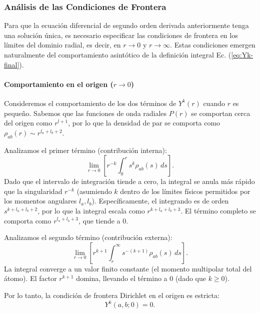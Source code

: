 \documentclass[12pt, a4paper, oneside, spanish]{book}
\begin{document}
\subsubsection{Análisis de las Condiciones de Frontera}

Para que la ecuación diferencial de segundo orden derivada anteriormente tenga una solución única, es necesario especificar las condiciones de frontera en los límites del dominio radial, es decir, en $r \to 0$ y $r \to \infty$. Estas condiciones emergen naturalmente del comportamiento asintótico de la definición integral Ec. (\cref{eq:Yk-final}).

\paragraph{Comportamiento en el origen ($r \to 0$)}

Consideremos el comportamiento de los dos términos de $Y^k(r)$ cuando $r$ es pequeño. Sabemos que las funciones de onda radiales $P(r)$ se comportan cerca del origen como $r^{l+1}$, por lo que la densidad de par se comporta como $\rho_{ab}(r) \sim r^{l_a + l_b + 2}$.

Analizamos el primer término (contribución interna):
\begin{equation}
    \lim_{r \to 0} \left[ r^{-k} \int_0^r s^k \rho_{ab}(s) \, ds \right].
\end{equation}
Dado que el intervalo de integración tiende a cero, la integral se anula más rápido que la singularidad $r^{-k}$ (asumiendo $k$ dentro de los límites físicos permitidos por los momentos angulares $l_a, l_b$). Específicamente, el integrando es de orden $s^{k + l_a + l_b + 2}$, por lo que la integral escala como $r^{k + l_a + l_b + 3}$. El término completo se comporta como $r^{l_a + l_b + 3}$, que tiende a 0.

Analizamos el segundo término (contribución externa):
\begin{equation}
    \lim_{r \to 0} \left[ r^{k+1} \int_r^{\infty} s^{-(k+1)} \rho_{ab}(s) \, ds \right].
\end{equation}
La integral converge a un valor finito constante (el momento multipolar total del átomo). El factor $r^{k+1}$ domina, llevando el término a 0 (dado que $k \geq 0$).

Por lo tanto, la condición de frontera Dirichlet en el origen es estricta:
\begin{equation}
\label{eq:bc-origin}
    Y^k(a,b; 0) = 0.
\end{equation}
\end{document}
